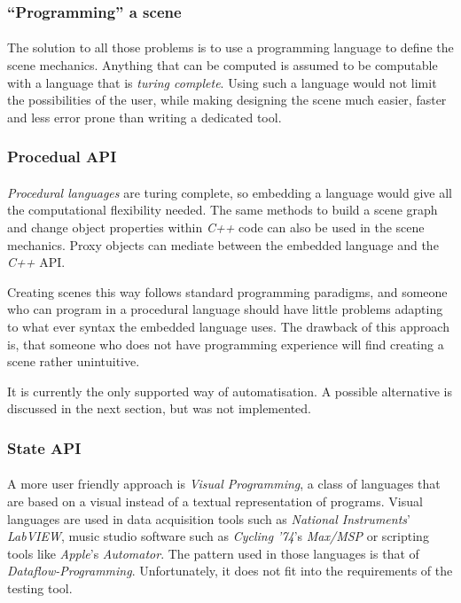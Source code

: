 \subsubsection{``Programming'' a scene}
\paragraph{}
The solution to all those problems is to use a programming language to define the scene mechanics. Anything that can be computed is assumed to be computable with a language that is \textit{turing complete}\cite{turing}. Using such a language would not limit the possibilities of the user, while making designing the scene much easier, faster and less error prone than writing a dedicated tool.

\subsubsection{Procedual API}
 \paragraph{}
\textit{Procedural languages} are turing complete, so embedding a language would give all the computational flexibility needed. The same methods to build a scene graph and change object properties within \textit{C++} code can also be used in the scene mechanics. Proxy objects can mediate between the embedded language and the \textit{C++} API.

Creating scenes this way follows standard programming paradigms, and someone who can program in a procedural language should have little problems adapting to what ever syntax the embedded language uses. The drawback of this approach is, that someone who does not have programming experience will find creating a scene rather unintuitive.

It is currently the only supported way of automatisation.
A possible alternative is discussed in the next section, but was not implemented.

\subsubsection{State API}
\paragraph{}
A more user friendly approach is \textit{Visual Programming}, a class of languages that are based on a visual instead of a textual representation of programs. Visual languages are used in data acquisition tools such as \textit{National Instruments}' \textit{LabVIEW}, music studio software such as \textit{Cycling '74}'s \textit{Max/MSP} or scripting tools like \textit{Apple}'s \textit{Automator}.
The pattern used in those languages is that of \textit{Dataflow-Programming}\cite{dataflow}. Unfortunately, it does not fit into the requirements of the testing tool.

